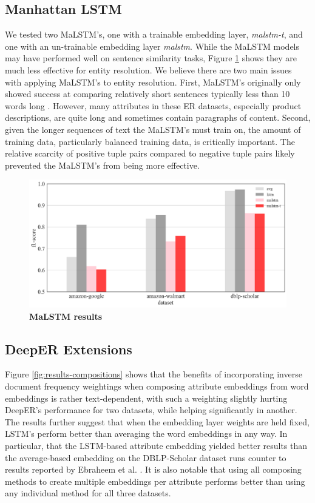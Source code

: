 \documentclass{proc}
\begin{document}
\subsection{Manhattan LSTM}

We tested two MaLSTM's, one with a trainable embedding layer, \textit{malstm-t}, and one with 
an un-trainable embedding layer \textit{malstm}. While the MaLSTM models may have performed well on sentence similarity tasks, Figure \ref{fig:results-malstm} shows they are much less effective for entity resolution. We believe there are two main issues with applying MaLSTM's to entity resolution. First, MaLSTM's originally only showed success at comparing relatively short sentences typically less than 10 words long \cite{mueller-siamese}. However, many attributes in these ER datasets, especially product descriptions, are quite long and sometimes contain paragraphs of content. Second, given the longer sequences of text the MaLSTM's must train on, the amount of training data, particularly balanced training data, is critically important. The relative scarcity of positive tuple pairs compared to negative tuple pairs likely prevented the MaLSTM's from being more effective.

\begin{figure}
	\includegraphics[scale=0.27]{../imgs/results-malstm.png}
	\caption{\textbf{MaLSTM results}}
	\label{fig:results-malstm}
\end{figure}

\subsection{DeepER Extensions}

Figure \ref{fig:results-compositions} shows that the benefits of incorporating inverse document frequency weightings when composing attribute embeddings from word embeddings is rather text-dependent, with such a weighting slightly hurting DeepER's performance for two datasets, while helping significantly in another. The results further suggest that when the embedding layer weights are held fixed, LSTM's perform better than averaging the word embeddings in any way. In particular, that the LSTM-based attribute embedding yielded better results than the average-based embedding on the DBLP-Scholar dataset runs counter to results reported by Ebraheem et al. \cite{ebraheem-deep-er}. It is also notable that using all composing methods to create multiple embeddings per attribute performs better than using any individual method for all three datasets.
\end{document}
